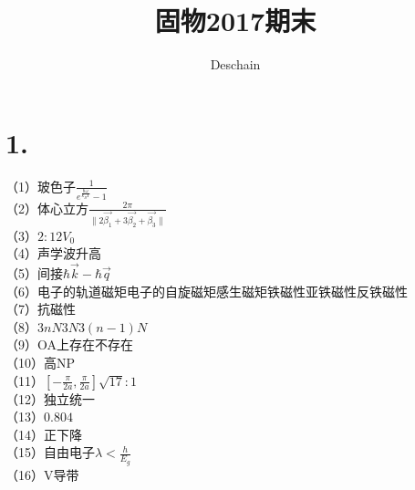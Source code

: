 \documentclass[UTF8]{ctexart}
\title{固物2017期末}
\author{Deschain}
\begin{document}
\maketitle
\section*{1.}
（1）玻色子$\frac{1}{e^{\frac{\hbar\omega}{k_BT}}-1}$\\
（2）体心立方$\frac{2\pi}{\lVert2\vec{\beta_1}+3\vec{\beta_2}+\vec{\beta_3}\rVert}$\\
（3）$2:1$$2V_0$\\
（4）声学波升高\\
（5）间接$\hbar \vec{k}-\hbar \vec{q}$\\
（6）电子的轨道磁矩电子的自旋磁矩感生磁矩铁磁性亚铁磁性反铁磁性\\
（7）抗磁性\\
（8）$3nN$$3N$$3(n-1)N$\\
（9）OA上存在不存在\\
（10）高NP\\
（11）$[-\frac{\pi}{2a},\frac{\pi}{2a}]$$\sqrt{17}:1$\\
（12）独立统一\\
（13）$0.804$\\
（14）正下降\\
（15）自由电子$\lambda<\frac{h}{E_g}$\\
（16）V导带\\
\end{document}
